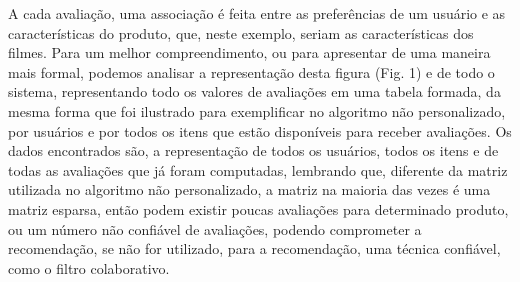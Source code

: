 \documentclass[12pt,
				openright,
				twoside,
				a4paper,
				apter=TITLE,
				section=TITLE,
				subsection=TITLE,
				chapter=TITLE,
				english,
				brazil]{abntex2}
\newcommand{\mc}[3]{\multicolumn{#1}{#2}{#3}}
\begin{document}
A cada avaliação, uma associação é feita entre as preferências de um usuário e as características do produto, que, neste exemplo, seriam as características dos filmes. Para um melhor compreendimento, ou para apresentar de uma maneira mais formal, podemos analisar a representação desta figura (Fig. 1) e de todo o sistema, representando todo os valores de avaliações em uma tabela formada, da mesma forma que foi ilustrado para exemplificar no algoritmo não personalizado, por usuários e por todos os itens que estão disponíveis para receber avaliações. Os dados encontrados são, a representação de todos os usuários, todos os itens e de todas as avaliações que já foram computadas, lembrando que, diferente da matriz utilizada no algoritmo não personalizado, a matriz na maioria das vezes é uma matriz esparsa, então podem existir poucas avaliações para determinado produto, ou um número não confiável de avaliações, podendo comprometer a recomendação, se não for utilizado, para a recomendação, uma técnica confiável, como o filtro colaborativo.

{%
}%
\end{document}
